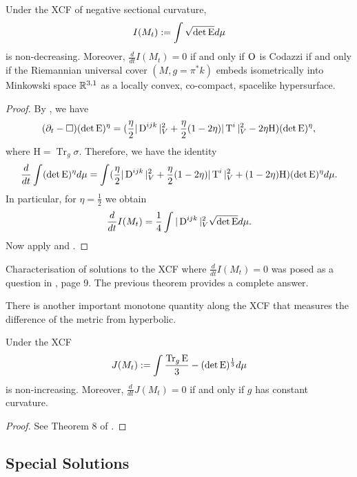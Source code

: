 \documentclass[a4paper, 12pt]{amsart}
\begin{document}
\begin{thm}
\label{thm:volume_monotonicity}
Under the XCF of negative sectional curvature,
\[
I(M_t):=\int \sqrt{\det\operatorname{E}}d\mu
\]
is non-decreasing. Moreover, \(\frac{d}{dt} I(M_t)= 0\) if and only if \(\operatorname{O}\) is Codazzi if and only if the Riemannian universal cover \((M, g = \pi^{\ast} k)\) embeds isometrically into Minkowski space \(\mathbb{R}^{3,1}\) as a locally convex, co-compact, spacelike hypersurface.
\end{thm}
\begin{proof}
By \cite[Proposition 9]{MR2055396}, we have
\begin{align}
(\partial_t-\Box)(\det\operatorname{E})^\eta=(\frac{\eta}{2}|\operatorname{D}^{ijk}|_V^2+\frac{\eta}{2}(1-2\eta)|\operatorname{T}^i|^2_V-2\eta\mathrm{H})(\det\operatorname{E})^\eta,
\end{align}
where $\mathrm{H}=\operatorname{Tr}_g\sigma.$ Therefore, we have the identity
\begin{align}
\frac{d}{dt}\int(\det\operatorname{E})^\eta d\mu=\int (\frac{\eta}{2}|\operatorname{D}^{ijk}|_V^2+\frac{\eta}{2}(1-2\eta)|\operatorname{T}^i|^2_V+(1-2\eta)\mathrm{H})(\det\operatorname{E})^\eta d\mu.
\end{align}
In particular, for $\eta=\frac{1}{2}$ we obtain
\begin{align}
\frac{d}{dt}I(M_t)=\frac{1}{4}\int |\operatorname{D}^{ijk}|_V^2\sqrt{\det\operatorname{E}}d\mu.
\end{align}
Now apply  and .
\end{proof}
\begin{rem}
Characterisation of solutions to the XCF where \(\frac{d}{dt} I(M_t) = 0\) was posed as a question in \cite{MR2055396}, page 9. The previous theorem provides a complete answer.
\end{rem}
There is another important monotone quantity along the XCF that measures the difference of the metric from hyperbolic.
\begin{thm}\label{thm:hyperboliicity}
Under the XCF
\[J(M_t):=\int \frac{\operatorname{Tr}_g\operatorname{E}}{3}- (\det\operatorname{E})^{\frac{1}{3}}d\mu\]
is non-increasing. Moreover, \(\frac{d}{dt}J(M_t) = 0\) if and only if $g$ has constant curvature.
\end{thm}
\begin{proof}
See Theorem 8 of \cite{MR2055396}.
\end{proof}

\subsection{Special Solutions}
\label{subsec:xcf_special}
\end{document}
